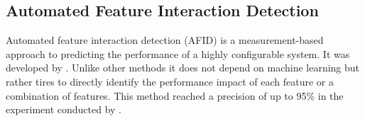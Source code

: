 \newcommand\AFID{\hyperref[sec:AFID]{AFID}}


\subsection{Automated Feature Interaction Detection}\label{sec:AFID}

Automated feature interaction detection (AFID) is a measurement-based approach to predicting the performance of a highly configurable system.
It was developed by \citet{AutomatedFeatureDetectionSiegmund2012}. Unlike other methods it does not depend on machine learning but rather tires to directly identify the performance impact of each feature or a combination of features. This method reached a precision of up to 95\% in the experiment conducted by  \citet{AutomatedFeatureDetectionSiegmund2012}.

